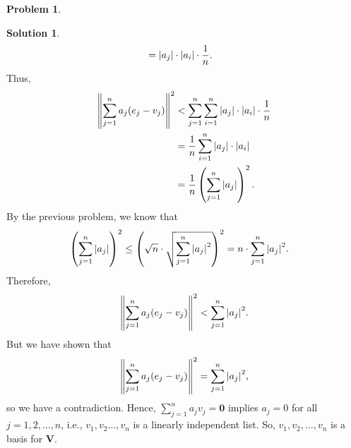 \documentclass{article}
\theoremstyle{definition}
\newtheorem*{prob*}{Problem}
\newtheorem*{sln*}{Solution}
\newcommand{\V}{\mathbf{V}}
\begin{document}
\begin{prob*}
\begin{enumerate}
\begin{sln*}
\begin{align*}
			&= \abs{a_j}\cdot \abs{a_i}\cdot \frac{1}{n}.
			\end{align*}
			Thus,
			\begin{align*}
			\norm{\sum^n_{j=1} a_j(e_j - v_j)}^2
			&< \sum^n_{j=1}\sum^n_{i=1} \abs{a_j}\cdot \abs{a_i}\cdot \frac{1}{n}\\
			&= \frac{1}{n}\sum^n_{i=1} \abs{a_j}\cdot \abs{a_i}\\
			&= \frac{1}{n}\left( \sum^n_{j=1}\vert a_j\vert \right)^2.
			\end{align*}
			By the previous problem, we know that
			\begin{align*}
			\left( \sum^n_{j=1}\vert a_j\vert \right)^2 
			&\leq \left( \sqrt{n}\cdot \sqrt{\sum^n_{j=1}\abs{a_j}^2 } \right)^2
			= n\cdot \sum^n_{j=1}\abs{a_j}^2.
			\end{align*}
			Therefore,
			\begin{align*}
			\norm{\sum^n_{j=1} a_j(e_j - v_j)}^2 < \sum^n_{j=1}\abs{a_j}^2.
			\end{align*}
			But we have shown that
			\begin{align*}
			\norm{\sum^n_{j=1} a_j(e_j - v_j)}^2 = \sum^n_{j=1}\abs{a_j}^2,
			\end{align*}
			so we have a contradiction. Hence, $\sum^n_{j=1}a_jv_j = \mathbf{0}$ implies $a_j = 0$ for all $j=1,2,\dots,n$, i.e., $v_1,v_2\dots,v_n$ is a linearly independent list. So, $v_1, v_2,\dots,v_n$ is a basis for $\V$.
		\end{sln*}
	\end{enumerate}
	
\end{prob*}




\newpage
\end{document}
